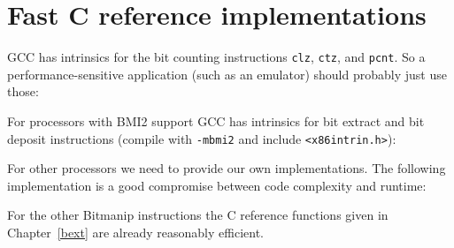 
\section{Fast C reference implementations}
\label{fastc}

GCC has intrinsics for the bit counting instructions {\tt clz}, {\tt ctz}, and
{\tt pcnt}.  So a performance-sensitive application (such as an emulator)
should probably just use those:



For processors with BMI2 support GCC has intrinsics for bit extract and bit
deposit instructions (compile with {\tt -mbmi2} and include {\tt <x86intrin.h>}):



For other processors we need to provide our own implementations. The following
implementation is a good compromise between code complexity and runtime:



For the other Bitmanip instructions the C reference functions given in Chapter~\ref{bext}
are already reasonably efficient.

